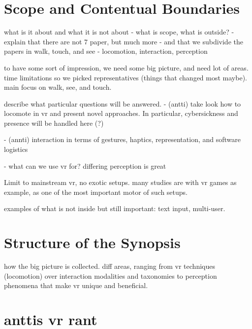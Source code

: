\section{Scope and Contentual Boundaries}
what is it about and what it is not about
- what is scope, what is outside?
- explain that there are not 7 paper, but much more
- and that we subdivide the papers in walk, touch, and see - locomotion, interaction, perception






to have some sort of impression, we need some big picture, and need lot of areas. time limitations so we picked representatives (things that changed most maybe). main focus on walk, see, and touch.

describe what particular questions will be answered.
- (antti) take look how to locomote in vr and present novel approaches. In particular, cybersickness and presence will be handled here (?)


- (annti) interaction in terms of gestures, haptics, representation, and software logistics


- what can we use vr for? differing perception is great


Limit to mainstream vr, no exotic setups.
many studies are with vr games as example, as one of the most important motor of such setups.


examples of what is not inside but still important: text input, multi-user.




\section{Structure of the Synopsis}

how the big picture is collected. diff areas, ranging from vr techniques (locomotion) over interaction modalities and taxonomies to perception phenomena that make vr unique and beneficial.



\section{anttis vr rant}


